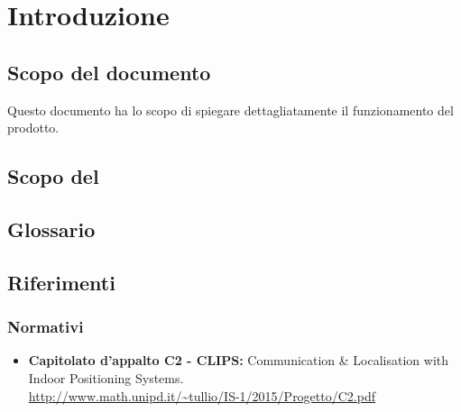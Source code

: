 \section{Introduzione}
\label{introduzione}
\subsection{Scopo del documento} 
Questo documento ha lo scopo di spiegare dettagliatamente il funzionamento del prodotto.
\subsection{Scopo del }
\SCOPO
\subsection{Glossario}
\GLOSSARIO
\subsection{Riferimenti}
\subsubsection{Normativi}
\begin{itemize}
	\item \textbf{Capitolato d'appalto C2 - CLIPS:} Communication \& Localisation with Indoor Positioning Systems. \\
	\url{http://www.math.unipd.it/~tullio/IS-1/2015/Progetto/C2.pdf}
\end{itemize}	
